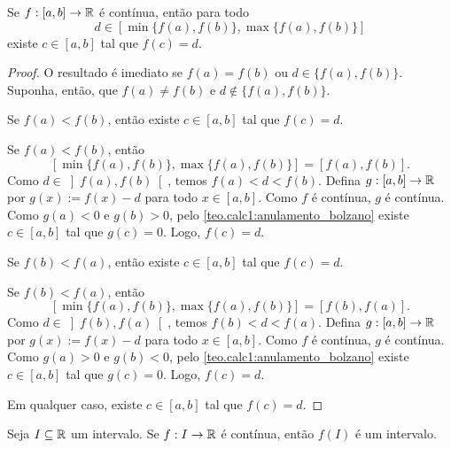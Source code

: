 \begin{theorem} \label{teo.calc1:TVI}
    Se $f : [a,b] \to \mathbb{R}$ é contínua, então para todo
        \[
            d \in [\min{\{f(a),f(b)\}}, \max{\{f(a),f(b)\}}]
        \]
    existe $c \in [a,b]$ tal que $f(c) = d$.    
\end{theorem}

\begin{proof}
    O resultado é imediato se $f(a) = f(b)$ ou $d \in \{f(a), f(b)\}$. Suponha, então, que $f(a) \neq f(b)$ e $d \notin \{f(a), f(b) \}$.
        \begin{claim}
            Se $f(a) < f(b)$, então existe $c \in [a,b]$ tal que $f(c) = d$.
        \end{claim}
        \begin{midproof}
            Se $f(a) < f(b)$, então
                \[
                    [\min{\{f(a),f(b)\}}, \max{\{f(a),f(b)\}}] = [f(a), f(b)].
                \]
            Como $d \in \left]f(a), f(b) \right[$, temos $f(a) < d < f(b)$. Defina $g : [a,b] \to \mathbb{R}$ por $g(x) := f(x) - d$ para todo $x \in [a,b]$. Como $f$ é contínua, $g$ é contínua. Como $g(a) < 0$ e $g(b) > 0$, pelo \cref{teo.calc1:anulamento_bolzano} existe $c \in [a,b]$ tal que $g(c) = 0$. Logo, $f(c) = d$. \whiteproof
        \end{midproof}
        \begin{claim}
            Se $f(b) < f(a)$, então existe $c \in [a,b]$ tal que $f(c) = d$.
        \end{claim}
        \begin{midproof}
            Se $f(b) < f(a)$, então
                \[
                    [\min{\{f(a),f(b)\}}, \max{\{f(a),f(b)\}}] = [f(b), f(a)].
                \]
            Como $d \in \left]f(b), f(a) \right[$, temos $f(b) < d < f(a)$. Defina $g : [a,b] \to \mathbb{R}$ por $g(x) := f(x) - d$ para todo $x \in [a,b]$. Como $f$ é contínua, $g$ é contínua. Como $g(a) > 0$ e $g(b) < 0$, pelo \cref{teo.calc1:anulamento_bolzano} existe $c \in [a,b]$ tal que $g(c) = 0$. Logo, $f(c) = d$. \whiteproof
        \end{midproof}
    Em qualquer caso, existe $c \in [a,b]$ tal que $f(c) = d$. \blackproof
\end{proof}

\begin{corollary}
    Seja $I \subseteq \mathbb{R}$ um intervalo. Se $f : I  \to \mathbb{R}$ é contínua, então $f(I)$ é um intervalo.
\end{corollary}

